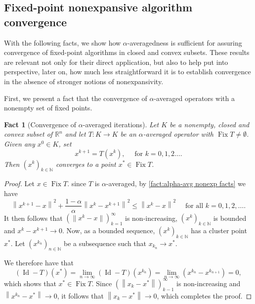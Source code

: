 \documentclass[smallextended,numbook,nospthms]{svjour3}
\theoremstyle{plain}
\newtheorem{fact}[theorem]{Fact}
\theoremstyle{definition}
\def\RR{\mathds R}
\def\NN{\mathds N}
\DeclareMathOperator{\Id}{Id}
\DeclareMathOperator{\Fix}{Fix}
\begin{document}
\subsection{Fixed-point nonexpansive algorithm convergence}\label{subsec:fix conv}
With the following facts, we show how $\alpha$-averagedness is sufficient for assuring convergence of fixed-point algorithms in closed and convex subsets. These results are relevant not only for their direct application, but also to help put into perspective, later on, how much less straightforward it is to establish convergence in the absence of stronger notions of nonexpansivity.

First, we present a fact that  the convergence of $\alpha$-averaged operators with a nonempty set of fixed points.
\begin{fact}[Convergence of $\alpha$-averaged iterations]\label{fact:conv avg iter} Let $K$ be a nonempty, closed and convex subset of $\RR^n$ and let $T: K \rightarrow K$ be an $\alpha$-averaged operator with $\Fix T \neq \emptyset$. Given any $x^{0} \in K$, set
\[
x^{k+1}=T\left(x^{k}\right), \quad \text { for } k=0,1,2 \dots.
\]
Then $\left(x^{k}\right)_{k \in \NN}$ converges to a point $x^{*} \in \Fix T$.
\end{fact}
\begin{proof}
Let $x \in \Fix T$. since $T$ is $\alpha$-averaged, by \cref{fact:alpha-avg nonexp facts} we have
\[
\left\|x^{k+1}-x\right\|^{2}+\frac{1-\alpha}{\alpha}\left\|x^{k}-x^{k+1}\right\|^{2} \leq\left\|x^{k}-x\right\|^{2} \quad \text { for all } k=0,1,2, \dots.
\]
It then follows that $\left(\|x^{k}-x\|\right)_{k=1}^{\infty}$ is non-increasing, $\left(x^{k}\right)_{k \in \NN}$ is bounded and $x^{k}-x^{k+1} \rightarrow 0$. Now, as a bounded sequence, $\left(x^{k}\right)_{k \in \NN}$ has a cluster point $x^{*}$. Let $\left(x^{k_{n}}\right)_{n \in \NN}$ be a subsequence such that $x_{k_{n}} \rightarrow x^{*}$. 

We therefore have that
\[
(\Id-T)\left(x^{*}\right)=\lim _{n \rightarrow \infty}(\Id-T)\left(x^{k_{n}}\right)=\lim _{n \rightarrow \infty}\left(x^{k_{n}}-x^{k_{n+1}}\right)=0,
\]
which shows that $x^{*} \in \Fix T$. Since $\left(\left\|x_{k}-x^{*}\right\|\right)_{k-1}^{\infty}$ is non-increasing and $\left\|x^{k_{n}}-x^{*}\right\| \rightarrow 0$, it follows that $\left\|x_{k}-x^{*}\right\| \rightarrow 0$, which completes the proof.
\end{proof}
\end{document}
